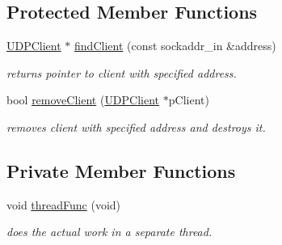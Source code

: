 \subsection*{Protected Member Functions}
\begin{DoxyCompactItemize}
\item 
\hyperlink{classTBT_1_1UDPClient}{U\+D\+P\+Client} $\ast$ \hyperlink{classTBT_1_1UDPClientInterface_aea926878d35ed4b37143e320143a84df_aea926878d35ed4b37143e320143a84df}{find\+Client} (const sockaddr\+\_\+in \&address)
\begin{DoxyCompactList}\small\item\em returns pointer to client with specified address. \end{DoxyCompactList}\item 
bool \hyperlink{classTBT_1_1UDPClientInterface_a1a80ed1e5670443bc35691c9f3d5ff72_a1a80ed1e5670443bc35691c9f3d5ff72}{remove\+Client} (\hyperlink{classTBT_1_1UDPClient}{U\+D\+P\+Client} $\ast$p\+Client)
\begin{DoxyCompactList}\small\item\em removes client with specified address and destroys it. \end{DoxyCompactList}\end{DoxyCompactItemize}
\subsection*{Private Member Functions}
\begin{DoxyCompactItemize}
\item 
void \hyperlink{classTBT_1_1UDPClientInterface_abce6a58e1d8fbb71f9b08e4d5b3871c2_abce6a58e1d8fbb71f9b08e4d5b3871c2}{thread\+Func} (void)
\begin{DoxyCompactList}\small\item\em does the actual work in a separate thread. \end{DoxyCompactList}\end{DoxyCompactItemize}

